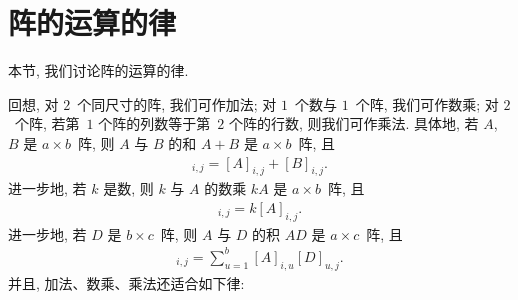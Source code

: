 \documentclass[../libro.tex]{subfiles}
\begin{document}

\section{阵的运算的律}

本节, 我们讨论阵的运算的律.

回想, 对 \(2\)~个同尺寸的阵, 我们可作加法;
对 \(1\)~个数与 \(1\)~个阵, 我们可作数乘;
对 \(2\)~个阵, 若第~\(1\) 个阵的列数等于第~\(2\) 个阵的行数,
则我们可作乘法.
具体地, 若 \(A\), \(B\) 是 \(a \times b\)~阵,
则 \(A\) 与 \(B\) 的和 \(A + B\) 是 \(a \times b\)~阵,
且
\begin{align*}
    [A + B]_{i,j} = [A]_{i,j} + [B]_{i,j}.
\end{align*}
进一步地, 若 \(k\) 是数,
则 \(k\) 与 \(A\) 的数乘 \(k A\) 是 \(a \times b\)~阵,
且
\begin{align*}
    [k A]_{i,j} = k [A]_{i,j}.
\end{align*}
进一步地, 若 \(D\) 是 \(b \times c\)~阵,
则 \(A\) 与 \(D\) 的积 \(A D\) 是 \(a \times c\)~阵,
且
\begin{align*}
    [A D]_{i,j} = \sum_{u = 1}^{b} {[A]_{i,u} [D]_{u,j}}.
\end{align*}
并且, 加法、数乘、乘法还适合如下律:
\end{document}
